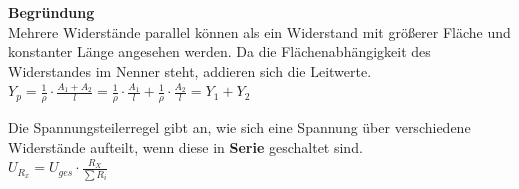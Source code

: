           \vspace{1em}

          \textbf{Begründung} \\
					Mehrere Widerstände parallel können als ein Widerstand mit größerer Fläche und konstanter Länge angesehen werden. Da die Flächenabhängigkeit des Widerstandes im Nenner steht, addieren sich die Leitwerte. \\
						$\displaystyle Y_p = \frac{1}{\rho} \cdot \frac{A_1 + A_2}{l} = \frac{1}{\rho} \cdot \frac{A_1}{l}  + \frac{1}{\rho} \cdot \frac{A_2}{l}  = Y_1 + Y_2 $


					\begin{center}
					\end{center}


					\beginip
					Die Spannungsteilerregel gibt an, wie sich eine Spannung über verschiedene Widerstände aufteilt, wenn diese in \textbf{Serie} geschaltet sind. \\
						\formulaBegin
						$\displaystyle U_{R_x} = U_{ges} \cdot \frac{R_X}{\sum R_i} $
						\formulaEnd

						\begin{center}
						\end{center}
					\iend


